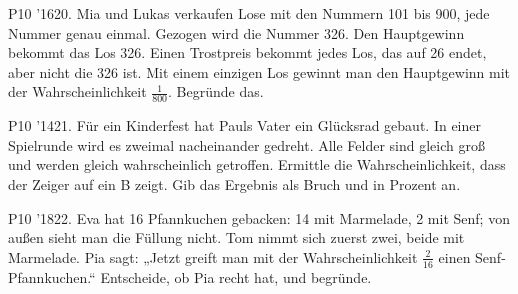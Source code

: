 \documentclass[11pt]{article}
\begin{document}
\pfgruppe{}
\begin{pfaufg}{P10 ’16}{20.}{}
Mia und Lukas verkaufen Lose mit den Nummern 101 bis 900, jede Nummer genau einmal. Gezogen wird die Nummer 326. Den Hauptgewinn bekommt das Los 326. Einen Trostpreis bekommt jedes Los, das auf 26 endet, aber nicht die 326 ist. Mit einem einzigen Los gewinnt man den Hauptgewinn mit der Wahrscheinlichkeit $\tfrac{1}{800}$. Begründe das.
\par\smallskip\noindent {}\par
{}
\end{pfaufg}
\pfgruppe{}
\begin{pfaufg}{P10 ’14}{21.}{}
Für ein Kinderfest hat Pauls Vater ein Glücksrad gebaut. In einer Spielrunde wird es zweimal nacheinander gedreht. Alle Felder sind gleich groß und werden gleich wahrscheinlich getroffen. Ermittle die Wahrscheinlichkeit, dass der Zeiger auf ein B zeigt. Gib das Ergebnis als Bruch und in Prozent an.
\par\smallskip\noindent {}\par
{}
\end{pfaufg}
\pfgruppe{}
\begin{pfaufg}{P10 ’18}{22.}{}
Eva hat 16 Pfannkuchen gebacken: 14 mit Marmelade, 2 mit Senf; von außen sieht man die Füllung nicht. Tom nimmt sich zuerst zwei, beide mit Marmelade. Pia sagt: „Jetzt greift man mit der Wahrscheinlichkeit $\tfrac{2}{16}$ einen Senf-Pfannkuchen.“ Entscheide, ob Pia recht hat, und begründe.
\end{pfaufg}
\end{document}
